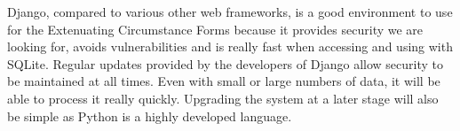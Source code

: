 \documentclass[../main.tex]{subfiles}
\begin{document}
\raggedright
Django, compared to various other web frameworks, is a good environment to use for the Extenuating Circumstance Forms because it provides security we are looking for, avoids vulnerabilities and is really fast when accessing and using with SQLite. Regular updates provided by the developers of Django allow security to be maintained at all times. Even with small or large numbers of data, it will be able to process it really quickly. Upgrading the system at a later stage will also be simple as Python is a highly developed language. 
\end{document}
